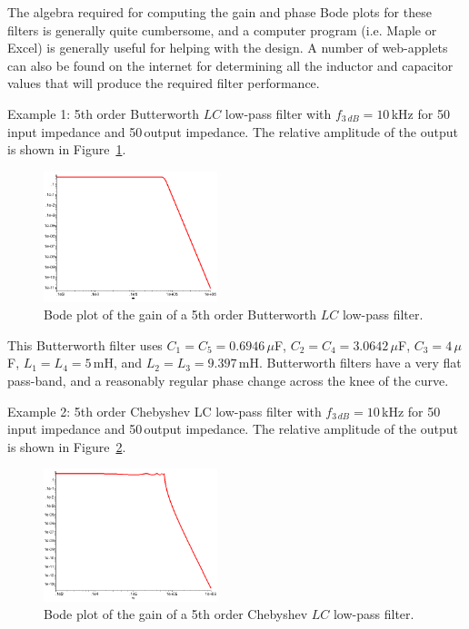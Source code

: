 \documentclass{article}
\begin{document}
The algebra required for computing the gain and phase Bode plots for these filters is generally quite cumbersome, and a computer program (i.e. Maple or Excel) is generally useful for helping with the design. A number of web-applets can also be found on the internet for determining all the inductor and capacitor values that will produce the required filter performance.

Example 1: 5th order Butterworth $LC$ low-pass filter with $f_{3\,dB} = 10$\,kHz for 50\,\Ohm input impedance and 50\,\Ohm output impedance. The relative amplitude of the output is shown in Figure~\ref{fig:lc_low_pass_butterworth_filter_5th_order}.

\begin{figure}
\begin{center}
\includegraphics[width=0.45\textwidth]{pics/lc_low_pass_butterworth_filter_5th_order}
\end{center}
\caption{Bode plot of the gain of a 5th order Butterworth $LC$ low-pass filter.}
\label{fig:lc_low_pass_butterworth_filter_5th_order}
\end{figure}

This Butterworth filter uses $C_1 = C_5 = 0.6946\,\mu$F, $C_2 = C_4 = 3.0642\,\mu$F, $C_3 = 4\,\mu$F, $L_1 = L_4 = 5$\,mH, and $L_2 = L_3 = 9.397$\,mH. Butterworth filters have a very flat pass-band, and a reasonably regular phase change across the knee of the curve.

Example 2: 5th order Chebyshev LC low-pass filter with $f_{3\,dB} = 10$\,kHz for 50\,\Ohm input impedance and 50\,\Ohm output impedance. The relative amplitude of the output is shown in Figure~\ref{fig:lc_low_pass_chebyshev_filter_5th_order}.


\begin{figure}
\begin{center}
\includegraphics[width=0.45\textwidth]{pics/lc_low_pass_chebyshev_filter_5th_order}
\end{center}
\caption{Bode plot of the gain of a 5th order Chebyshev $LC$ low-pass filter.}
\label{fig:lc_low_pass_chebyshev_filter_5th_order}
\end{figure}
\end{document}
